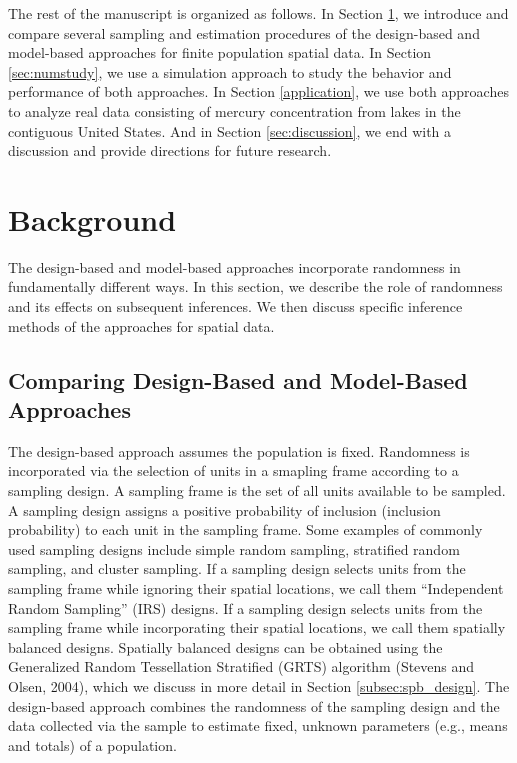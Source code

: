 \documentclass[]{elsarticle} %
\begin{document}
The rest of the manuscript is organized as follows. In Section
\ref{sec:background}, we introduce and compare several sampling and
estimation procedures of the design-based and model-based approaches for
finite population spatial data. In Section \ref{sec:numstudy}, we use a
simulation approach to study the behavior and performance of both
approaches. In Section \ref{application}, we use both approaches to
analyze real data consisting of mercury concentration from lakes in the
contiguous United States. And in Section \ref{sec:discussion}, we end
with a discussion and provide directions for future research.

\hypertarget{sec:background}{%
\section{Background}\label{sec:background}}

The design-based and model-based approaches incorporate randomness in
fundamentally different ways. In this section, we describe the role of
randomness and its effects on subsequent inferences. We then discuss
specific inference methods of the approaches for spatial data.

\hypertarget{subsec:dvm_compare}{%
\subsection{Comparing Design-Based and Model-Based
Approaches}\label{subsec:dvm_compare}}

The design-based approach assumes the population is fixed. Randomness is
incorporated via the selection of units in a smapling frame according to
a sampling design. A sampling frame is the set of all units available to
be sampled. A sampling design assigns a positive probability of
inclusion (inclusion probability) to each unit in the sampling frame.
Some examples of commonly used sampling designs include simple random
sampling, stratified random sampling, and cluster sampling. If a
sampling design selects units from the sampling frame while ignoring
their spatial locations, we call them ``Independent Random Sampling''
(IRS) designs. If a sampling design selects units from the sampling
frame while incorporating their spatial locations, we call them
spatially balanced designs. Spatially balanced designs can be obtained
using the Generalized Random Tessellation Stratified (GRTS) algorithm
(Stevens and Olsen, 2004), which we discuss in more detail in Section
\ref{subsec:spb_design}. The design-based approach combines the
randomness of the sampling design and the data collected via the sample
to estimate fixed, unknown parameters (e.g., means and totals) of a
population.
\end{document}
